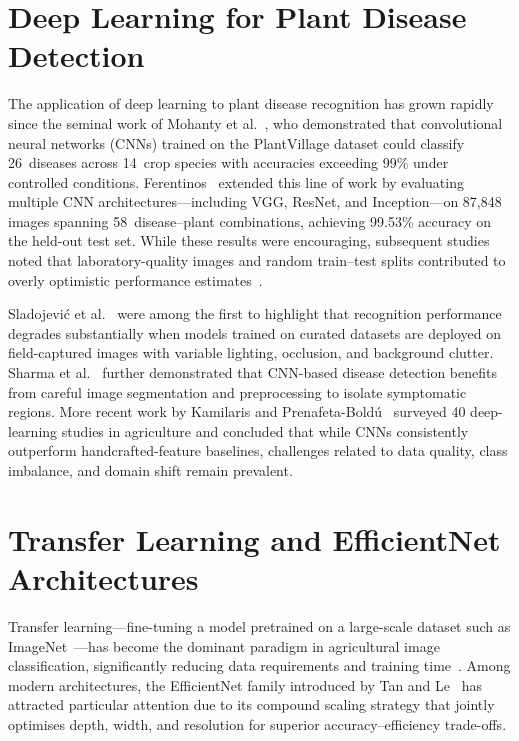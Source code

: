 \documentclass[12pt,a4paper]{report}
\begin{document}
\section{Deep Learning for Plant Disease Detection}
The application of deep learning to plant disease recognition has grown rapidly since the seminal work of Mohanty et al.~\cite{b7}, who demonstrated that convolutional neural networks (CNNs) trained on the PlantVillage dataset could classify 26~diseases across 14~crop species with accuracies exceeding 99\% under controlled conditions. Ferentinos~\cite{b5} extended this line of work by evaluating multiple CNN architectures---including VGG, ResNet, and Inception---on 87,848 images spanning 58~disease--plant combinations, achieving 99.53\% accuracy on the held-out test set. While these results were encouraging, subsequent studies noted that laboratory-quality images and random train--test splits contributed to overly optimistic performance estimates~\cite{b16,b6}.

Sladojevi\'{c} et al.~\cite{b6} were among the first to highlight that recognition performance degrades substantially when models trained on curated datasets are deployed on field-captured images with variable lighting, occlusion, and background clutter. Sharma et al.~\cite{b21} further demonstrated that CNN-based disease detection benefits from careful image segmentation and preprocessing to isolate symptomatic regions. More recent work by Kamilaris and Prenafeta-Bold\'{u}~\cite{b9} surveyed 40 deep-learning studies in agriculture and concluded that while CNNs consistently outperform handcrafted-feature baselines, challenges related to data quality, class imbalance, and domain shift remain prevalent.

\section{Transfer Learning and EfficientNet Architectures}
Transfer learning---fine-tuning a model pretrained on a large-scale dataset such as ImageNet~\cite{b15}---has become the dominant paradigm in agricultural image classification, significantly reducing data requirements and training time~\cite{b17}. Among modern architectures, the EfficientNet family introduced by Tan and Le~\cite{b1} has attracted particular attention due to its compound scaling strategy that jointly optimises depth, width, and resolution for superior accuracy--efficiency trade-offs.
\end{document}
